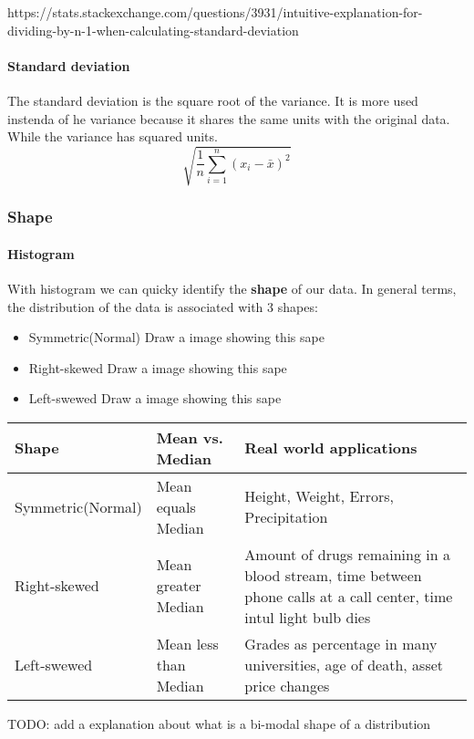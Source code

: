 \documentclass[]{article}
\begin{document}
https://stats.stackexchange.com/questions/3931/intuitive-explanation-for-dividing-by-n-1-when-calculating-standard-deviation

\paragraph{Standard deviation}
The standard deviation is the square root of the variance. It is more used instenda of he variance because it shares the same units with the original data. While the variance has squared units. 
\[ \sqrt{\frac{1}{n}\sum_{i=1}^{n}(x_{i} - \bar{x})^2} \]

\subsubsection{Shape}

\paragraph{Histogram}
With histogram we can quicky identify the \textbf{shape} of our data. In general terms, the distribution of the data is associated with 3 shapes:

\begin{itemize}
	\item Symmetric(Normal) 
	Draw a image showing this sape
	\item Right-skewed 
	Draw a image showing this sape
	\item Left-swewed 
	Draw a image showing this sape
\end{itemize}


\begin{center}
	\begin{tabular}{| l | l | l |}
		\hline
		Shape & Mean vs. Median & Real world applications \\ \hline
		Symmetric(Normal) & Mean equals Median & Height, Weight, Errors, Precipitation \\ \hline
		Right-skewed & Mean greater Median & Amount of drugs remaining in a blood stream, time between phone calls at a call center, time intul light bulb dies \\ \hline
		Left-swewed & Mean less than Median & Grades as percentage in many universities, age of death, asset price changes \\ \hline
	\end{tabular}
\end{center}

TODO: add a explanation about what is a bi-modal shape of a distribution
\end{document}
